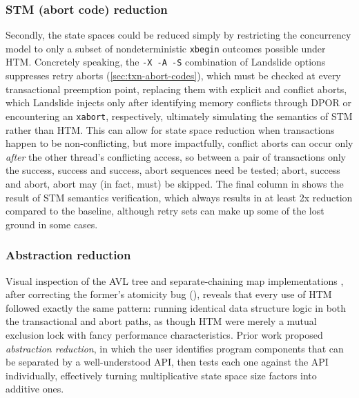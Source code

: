 \subsubsection{STM (abort code) reduction}
\label{sec:tm-eval-stm}

Secondly, the state spaces could be reduced
simply by restricting the concurrency model
to only a subset of nondeterministic {\tt xbegin} outcomes possible under HTM.
Concretely speaking,
the {\tt -X -A -S} combination of Landslide options
suppresses retry aborts
(\cref{sec:txn-abort-codes}),
which must be checked at every transactional preemption point,
replacing them with explicit and conflict aborts,
which Landslide injects only after identifying memory conflicts through DPOR
or encountering an {\tt xabort},
respectively,
ultimately simulating the semantics of STM rather than HTM.
This can allow for state space reduction %
when transactions happen to be non-conflicting,
but more impactfully,
conflict aborts can occur only {\em after} the other thread's conflicting access,
so between a pair of transactions
only the success, success and success, abort sequences need be tested;
abort, success and abort, abort may (in fact, must) be skipped.
The final column in  shows the result of STM semantics verification,
which always results in at least 2x reduction compared to the baseline,
although retry sets can make up some of the lost ground in some cases.

\subsubsection{Abstraction reduction}
\label{sec:tm-abstraction}

Visual inspection of the AVL tree and separate-chaining map implementations \cite{tm-benchmark-cmu},
after correcting the former's atomicity bug (),
reveals that every use of HTM followed exactly the same pattern:
running identical data structure logic in both the transactional and abort paths,
as though HTM were merely a mutual exclusion lock with fancy performance characteristics.
Prior work \cite{dbug-phdthesis} proposed {\em abstraction reduction},
in which the user identifies program components that can be separated by a well-understood API,
then tests each one against the API individually,
effectively turning multiplicative state space size factors into additive ones.

